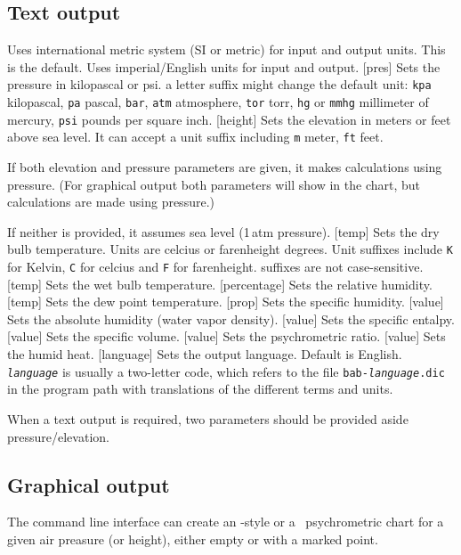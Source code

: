 \documentclass[letterpaper]{article}
\begin{document}
\subsection{Text output}
\begin{clioptions}
 Uses international metric system (SI or metric) for
  input and output units. This is the default.
 Uses imperial/English units for input and output.
[pres] Sets the pressure in kilopascal or psi.
  a letter suffix might change the default unit:
  \texttt{kpa} kilopascal, \texttt{pa} pascal, \texttt{bar}, \texttt{atm}
  atmosphere, \texttt{tor} torr, \texttt{hg} or \texttt{mmhg} millimeter
  of mercury, \texttt{psi} pounds per square inch.
[height] Sets the elevation in meters or feet
  above sea level. It can accept a unit suffix including \texttt{m} meter,
  \texttt{ft} feet.

If both elevation and pressure parameters are given, it makes calculations
using pressure. (For graphical output both parameters will show in the
chart, but calculations are made using pressure.)

If neither is provided, it assumes sea level (1\,atm pressure).
[temp] Sets the dry bulb temperature. Units are celcius
  or farenheight degrees. Unit suffixes include \texttt{K} for Kelvin,
  \texttt{C} for celcius and \texttt{F} for farenheight. suffixes are not
  case-sensitive.
[temp] Sets the wet bulb temperature.
[percentage] Sets the relative humidity.
[temp] Sets the dew point temperature.
[prop] Sets the specific humidity.
[value] Sets the absolute humidity (water vapor density).
[value] Sets the specific entalpy.
[value] Sets the specific volume.
[value] Sets the psychrometric ratio.
[value] Sets the humid heat.
[language] Sets the output language. Default is English.
  \texttt{\textit{language}} is usually a two-letter code, which refers
  to the file \texttt{bab-\textit{language}.dic} in the program path
  with translations of the different terms and units.
\end{clioptions}

When a text output is required, two parameters should be provided aside
pressure/elevation.

\subsection{Graphical output}
The command line interface can create an \ashrae-style or a \mollier\ 
psychrometric chart for a given air preasure (or height), either empty
or with a marked point.
\end{document}
